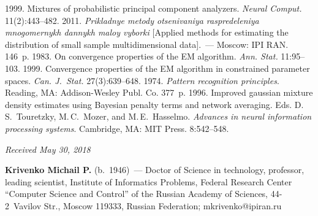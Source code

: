 





\vspace*{-4pt}

  \begin{multicols}{2}

\renewcommand{\bibname}{\protect\rmfamily References}

{\small\frenchspacing
 {%
 \begin{thebibliography}{9}
 1999. Mixtures of 
probabilistic principal component analyzers. \textit{Neural 
Comput.} 11(2):443--482.
 2011. \textit{Prikladnye metody 
otsenivaniya raspredeleniya mnogomernykh dannykh maloy 
vyborki} [Applied methods for estimating the distribution of small 
sample multidimensional data].~--- Moscow: IPI RAN. 146~p.
 1983. On convergence properties of the EM 
algorithm. \textit{Ann. Stat.} 11:95--103.
 1999. Convergence properties of the EM 
algorithm in constrained parameter spaces. \textit{Can. 
J.~Stat.} 27(3):639--648.
 1974.  \textit{Pattern 
recognition principles}. Reading, MA: Addison-Wesley Publ. 
Co. 377~p.
 1996. Improved gaussian 
mixture density estimates using Bayesian penalty terms and 
network averaging. Eds. D.\,S.~Touretzky, M.\,C.~Mozer, and 
M.\,E.~Hasselmo. \textit{Advances in neural information 
processing systems}.  Cambridge, MA: MIT Press.  
8:542--548. 
\end{thebibliography}

 }
 }

\end{multicols}

\vspace*{-9pt}

\hfill{\small\textit{Received May 30, 2018}}


\vspace*{-18pt}

\Contrl

\noindent
\textbf{Krivenko Michail P.} (b.\ 1946)~--- Doctor of Science in 
technology, professor, leading scientist, Institute of Informatics 
Problems, Federal Research Center ``Computer Science and 
Control'' of the Russian Academy of Sciences, 44-2~Vavilov Str., 
Moscow 119333, Russian Federation; 
\mbox{mkrivenko@ipiran.ru}


\label{end\stat}


\renewcommand{\bibname}{\protect\rm Литература} 